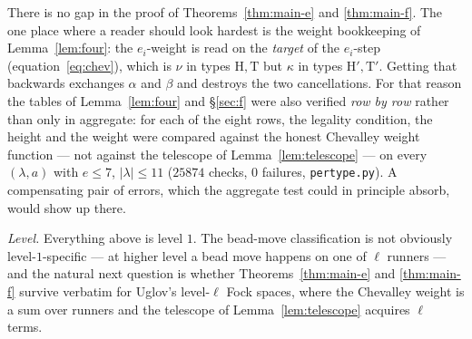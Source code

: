 \documentclass[11pt]{article}
\theoremstyle{plain}
\theoremstyle{definition}
\begin{document}
There is no gap in the proof of Theorems~\ref{thm:main-e} and \ref{thm:main-f}. The
one place where a reader should look hardest is the weight bookkeeping of
Lemma~\ref{lem:four}: the $e_i$-weight is read on the \emph{target} of the
$e_i$-step (equation~\eqref{eq:chev}), which is $\nu$ in types
$\mathrm H,\mathrm T$ but $\kappa$ in types $\mathrm H',\mathrm T'$. Getting that
backwards exchanges $\alpha$ and $\beta$ and destroys the two cancellations.
For that reason the tables of Lemma~\ref{lem:four} and \S\ref{sec:f} were also
verified \emph{row by row} rather than only in aggregate: for each of the eight rows,
the legality condition, the height and the weight were compared against the honest
Chevalley weight function --- not against the telescope of
Lemma~\ref{lem:telescope} --- on every $(\lambda,a)$ with $e\le7$, $|\lambda|\le11$
($25874$ checks, $0$ failures, \texttt{pertype.py}). A compensating pair of errors,
which the aggregate test could in principle absorb, would show up there.

\medskip
\noindent\emph{Level.} Everything above is level $1$. The bead-move classification
is not obviously level-$1$-specific --- at higher level a bead move happens on one
of $\ell$ runners --- and the natural next question is whether
Theorems~\ref{thm:main-e} and \ref{thm:main-f} survive verbatim for Uglov's
level-$\ell$ Fock spaces, where the Chevalley weight is a sum over runners and the
telescope of Lemma~\ref{lem:telescope} acquires $\ell$ terms.
\end{document}
